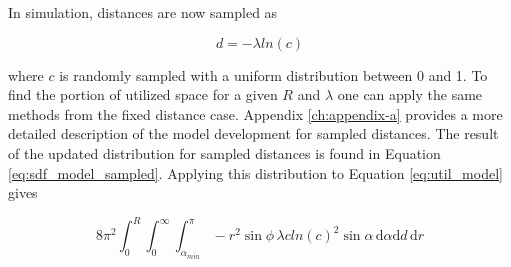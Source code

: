 In simulation, distances are now sampled as

\begin{equation}
  d = -\lambda ln(c)
\end{equation}

where $c$ is randomly sampled with a uniform distribution between 0 and 1. To
find the portion of utilized space for a given $R$ and $\lambda$ one can apply
the same methods from the fixed distance case.  Appendix \ref{ch:appendix-a}
provides a more detailed description of the model development for sampled
distances. The result of the updated distribution for sampled distances is found
in Equation \eqref{eq:sdf_model_sampled}. Applying this distribution to Equation
\eqref{eq:util_model} gives

\begin{equation}
  8\pi^{2} \int_{0}^{R}\int_{0}^{\infty}\int_{\alpha_{min}}^{\pi}
-r^2\sin{\phi} \, \lambda c ln(c)^2 \sin{\alpha} \, \mathrm{d}\alpha \mathrm{d}d
\, \mathrm{d}r
\end{equation}








